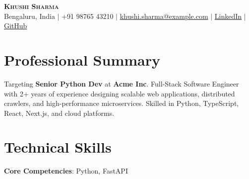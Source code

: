 \documentclass[letterpaper,10pt]{article}
\begin{document}
\begin{center}
    \textbf{\Huge \scshape Khushi Sharma} \\ \vspace{2pt}
    \small Bengaluru, India $|$ +91 98765 43210 $|$ \href{mailto:khushi.sharma@example.com}{khushi.sharma@example.com} $|$ \href{https://linkedin.com/in/khushi-sharma}{LinkedIn} $|$ \href{https://github.com/khushi-sharma}{GitHub}
\end{center}

\section{Professional Summary}
\small{Targeting \textbf{Senior Python Dev} at \textbf{Acme Inc}. Full-Stack Software Engineer with 2+ years of experience designing scalable web applications, distributed crawlers, and high-performance microservices. Skilled in Python, TypeScript, React, Next.js, and cloud platforms.}

\section{Technical Skills}
\begin{itemize}[leftmargin=0.15in, label={}]
    \small{\item{
     \textbf{Core Competencies}{: Python, FastAPI}
    }}
\end{itemize}

\end{document}
